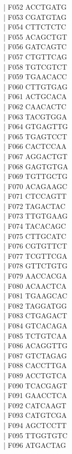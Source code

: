 \documentclass[titlepage,10pt,a4paper,uplatex]{jsbook}
\newenvironment{content}{\begin{shaded}\vspace{-1em}\raggedright\ttfamily\footnotesize\setlength{\baselineskip}{1.4em}}{\end{shaded}\vspace{-1em}}
\begin{document}
\begin{content}
| F052	ACCTGATG\\
| F053	CGATGTAG\\
| F054	CTTCTCTC\\
| F055	ACAGCTGT\\
| F056	GATCAGTC\\
| F057	CTGTTCAG\\
| F058	TGTCGTCT\\
| F059	TGAACACC\\
| F060	CTTGTGAG\\
| F061	ACTGCACA\\
| F062	CAACACTC\\
| F063	TACGTGGA\\
| F064	GTGAGTTG\\
| F065	TGAGTCCT\\
| F066	CACTCCAA\\
| F067	AGGACTGT\\
| F068	GAGTGTGA\\
| F069	TGTTGCTG\\
| F070	ACAGAAGC\\
| F071	CTCCAGTT\\
| F072	TAGACTAC\\
| F073	TTGTGAAG\\
| F074	TACACAGC\\
| F075	CTTGCATC\\
| F076	CGTGTTCT\\
| F077	TCGTTCGA\\
| F078	GTTCTGTG\\
| F079	AACCACGA\\
| F080	ACAACTCA\\
| F081	TGAAGCAC\\
| F082	TAGGATGG\\
| F083	CTGAGACT\\
| F084	GTCACAGA\\
| F085	TCTGTCAA\\
| F086	ACAGGTTG\\
| F087	GTCTAGAG\\
| F088	CACCTTGA\\
| F089	ACCTGTCA\\
| F090	TCACGAGT\\
| F091	GAACCTCA\\
| F092	CATCAAGT\\
| F093	CATGTCGA\\
| F094	AGCTCCTT\\
| F095	TTGGTGTC\\
| F096	ATGACTAG\\

\end{content}
\end{document}
